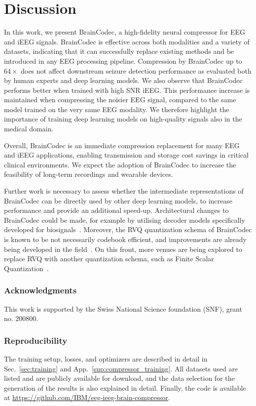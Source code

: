 \documentclass{article} %
\begin{document}
\section{Discussion}

In this work, we present BrainCodec, a high-fidelity neural compressor for EEG and iEEG signals. BrainCodec is effective across both modalities and a variety of datasets, indicating that it can successfully replace existing methods and be introduced in any EEG processing pipeline.
Compression by BrainCodec up to $64\times$ does not affect downstream seizure detection performance as evaluated both by human experts and deep learning models.
We also observe that BrainCodec performs better when trained with high SNR iEEG. This performance increase is maintained when compressing the noisier EEG signal, compared to the same model trained on the very same EEG modality.
We therefore highlight the importance of training deep learning models on high-quality signals also in the medical domain. 

Overall, BrainCodec is an immediate compression replacement for many EEG and iEEG applications, enabling transmission and storage cost savings in critical clinical environments. We expect the adoption of BrainCodec to increase the feasibility of long-term recordings and wearable devices.

Further work is necessary to assess whether the intermediate representations of BrainCodec can be directly used by other deep learning models, to increase performance and provide an additional speed-up. Architectural changes to BrainCodec could be made, for example by utilising decoder models specifically developed for biosignals~\citep{Zhang2023}. Moreover, the RVQ quantization schema of BrainCodec is known to be not necessarily codebook efficient, and improvements are already being developed in the field~\citep{Kumar2024}. On this front, more venues are being explored to replace RVQ with another quantization schema, such as Finite Scalar Quantization~\citep{Mentzer2024}.


\subsubsection*{Acknowledgments}
This work is supported by the Swiss National Science foundation (SNF), grant no. 200800.

\subsubsection*{Reproducibility}

The training setup, losses, and optimizers are described in detail in Sec.~\ref{sec:training} and App.~\ref{sup:compressor_training}. All datasets used are listed and are publicly available for download, and the data selection for the generation of the results is also explained in detail. Finally, the code is available at \url{https://github.com/IBM/eeg-ieeg-brain-compressor}.





\end{document}
